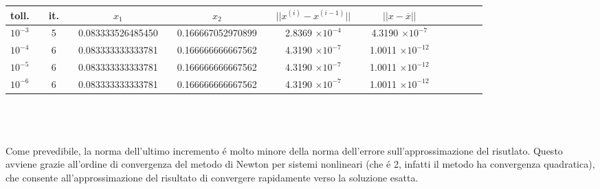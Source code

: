 \noindent\begin{tabular}{l*{15}{c}}
 toll. & \vline& it. & \vline& \(x_1\) &\vline& \(x_2\) & \vline& \(||x^{(i)} - x^{(i-1)}||\) & \vline& \(||x - \overline{x}||\) \\
\hline
 \(10^{-3}\) & \vline& 5 & \vline& \scriptsize{0.083333526485450}& \vline& \scriptsize{0.166667052970899} &\vline& 2.8369 \(\times 10^{-4}\) & \vline& 4.3190 \(\times 10^{-7}\) \\
 \(10^{-4}\) & \vline& 6 & \vline& \scriptsize{0.083333333333781}& \vline& \scriptsize{0.166666666667562} &\vline& 4.3190 \(\times 10^{-7}\) & \vline& 1.0011 \(\times 10^{-12}\) \\
 \(10^{-5}\) & \vline& 6 & \vline& \scriptsize{0.083333333333781}& \vline& \scriptsize{0.166666666667562} &\vline& 4.3190 \(\times 10^{-7}\) & \vline& 1.0011 \(\times 10^{-12}\) \\
 \(10^{-6}\) & \vline& 6 & \vline& \scriptsize{0.083333333333781}& \vline& \scriptsize{0.166666666667562} &\vline& 4.3190 \(\times 10^{-7}\) & \vline& 1.0011 \(\times 10^{-12}\) \\
\end{tabular} \\
\\
\\
\noindent Come prevedibile, la norma dell'ultimo incremento \'e molto minore della norma dell'errore sull'approssimazione del risutlato. Questo avviene grazie all'ordine di convergenza del metodo di Newton per sistemi nonlineari (che \'e 2, infatti il metodo ha convergenza quadratica), che consente all'approssimazione del risultato di convergere rapidamente verso la soluzione esatta.
